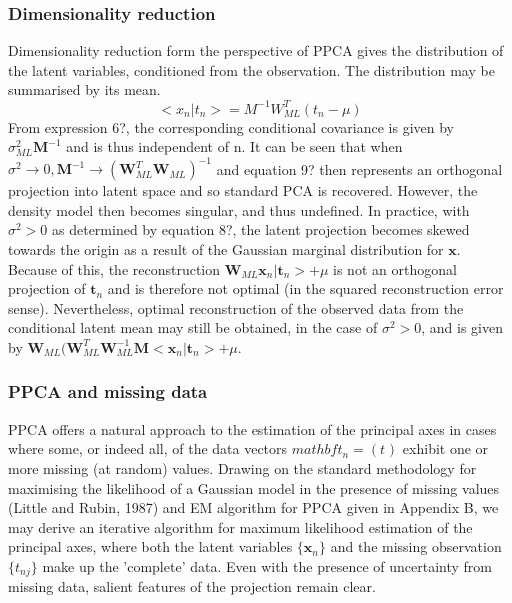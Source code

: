 \documentclass[ %
                    author={Dillon Keith Diep},
                supervisor={Dr. Carl Henrik Ek},
                    degree={MEng},
                     title={Assisted Content Generation for 3D Hair Geometry},
                  subtitle={[INCOMPLETE DRAFT, CONTAINS NOTES FROM RESEARCH]},
                      type={Research},
                      year={2014} ]{dissertation}
\begin{document}
\subsubsection{Dimensionality reduction}
Dimensionality reduction form the perspective of PPCA gives the distribution of the latent variables, conditioned from the observation. The distribution may be summarised by its mean.
\begin{equation}
	<x_n|t_n>=M^{-1}W^T_{ML}(t_n-\mu)
\end{equation}
From expression 6?, the corresponding conditional covariance is given by $\sigma^2_{ML}\mathbf{M}^{-1}$ and is thus independent of n. It can be seen that when $\sigma^2\rightarrow 0,\mathbf{M}^{-1}\rightarrow (\mathbf{W}^T_{ML}\mathbf{W}_{ML})^{-1}$ and equation 9? then represents an orthogonal projection into latent space and so standard PCA is recovered. However, the density model then becomes singular, and thus undefined. In practice, with $\sigma^2 > 0$ as determined by equation 8?, the latent projection becomes skewed towards the origin as a result of the Gaussian marginal distribution for $\mathbf{x}$. Because of this, the reconstruction $\mathbf{W}_{ML}\mathbf{x}_n|\mathbf{t}_n>+\mu$ is not an orthogonal projection of $\mathbf{t}_n$ and is therefore not optimal (in the squared reconstruction error sense). Nevertheless, optimal reconstruction of the observed data from the conditional latent mean may still be obtained, in the case of $\sigma^2 > 0$, and is given by $\mathbf{W}_{ML}(\mathbf{W}^T_{ML}\mathbf{W}_{ML}^{-1}\mathbf{M}<\mathbf{x}_n|\mathbf{t}_n>+\mu$.

\subsubsection{PPCA and missing data}
PPCA offers a natural approach to the estimation of the principal axes in cases where some, or indeed all, of the data vectors $mathbf{t}_n=(t_{})$ exhibit one or more missing (at random) values. Drawing on the standard methodology for maximising the likelihood of a Gaussian model in the presence of missing values (Little and Rubin, 1987) and EM algorithm for PPCA given in Appendix B, we may derive an iterative algorithm for maximum likelihood estimation of the principal axes, where both the latent variables $\{\mathbf{x}_n\}$ and the missing observation $\{t_{nj}\}$ make up the 'complete' data. Even with the presence of uncertainty from missing data, salient features of the projection remain clear.
\end{document}
